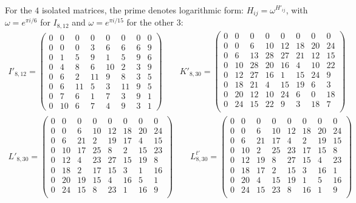 \documentclass[11pt,a4paper]{article}
\theoremstyle{plain}
\theoremstyle{definition}
\numberwithin{equation}{section}
\begin{document}
\begin{samepage}
For the $4$ isolated matrices, the prime denotes logarithmic form: $H_{ij}=\omega^{H'_{ij}}$, with $\omega=e^{\pi i/6}$ for $I_{8,12}$ and $\omega=e^{\pi i/15}$ for the other $3$:
{\setlength{\arraycolsep}{4pt}
$$\begin{gathered}
I'_{8,12}=\begin{pmatrix}
0 & 0 & 0 & 0 & 0 & 0 & 0 & 0 \\
0 & 0 & 0 & 3 & 6 & 6 & 6 & 9 \\
0 & 1 & 5 & 9 & 1 & 5 & 9 & 6 \\
0 & 4 & 8 & 6 & 10 & 2 & 3 & 9 \\
0 & 6 & 2 & 11 & 9 & 8 & 3 & 5 \\
0 & 6 & 11 & 5 & 3 & 11 & 9 & 5 \\
0 & 7 & 6 & 1 & 7 & 3 & 9 & 1 \\
0 & 10 & 6 & 7 & 4 & 9 & 3 & 1
\end{pmatrix}\qquad K'_{8,30}=\begin{pmatrix}
0&0&0&0&0&0&0&0\\
0&0&6&10&12&18&20&24\\
0&6&13&28&27&21&12&15\\
0&10&28&20&16&4&10&22\\
0&12&27&16&1&15&24&9\\
0&18&21&4&15&19&6&3\\
0&20&12&10&24&6&0&18\\
0&24&15&22&9&3&18&7\\
\end{pmatrix}\\[1em]
L'_{8,30}=\begin{pmatrix}
0&0&0&0&0&0&0&0\\
0&0&6&10&12&18&20&24\\
0&6&21&2&19&17&4&15\\
0&10&17&25&8&2&15&23\\
0&12&4&23&27&15&19&8\\
0&18&2&17&15&3&1&16\\
0&20&19&15&4&16&5&1\\
0&24&15&8&23&1&16&9\\
\end{pmatrix}\qquad L_{8,30}^{t\prime}=\begin{pmatrix}
0&0&0&0&0&0&0&0\\
0&0&6&10&12&18&20&24\\
0&6&21&17&4&2&19&15\\
0&10&2&25&23&17&15&8\\
0&12&19&8&27&15&4&23\\
0&18&17&2&15&3&16&1\\
0&20&4&15&19&1&5&16\\
0&24&15&23&8&16&1&9\\
\end{pmatrix}
\end{gathered}$$
}
\end{samepage}
\end{document}

